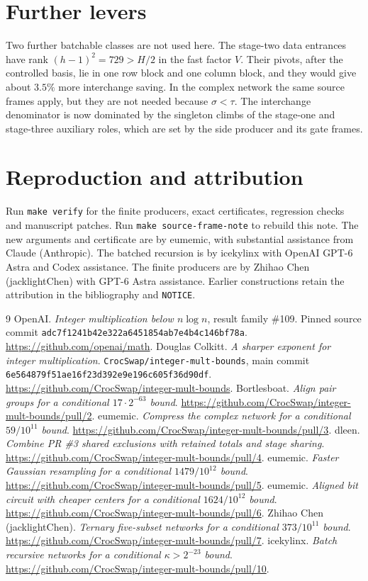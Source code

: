 \documentclass[11pt]{article}
\numberwithin{equation}{section}
\begin{document}
\section{Further levers}
Two further batchable classes are not used here. The stage-two data
entrances have rank $(h-1)^2=729>H/2$ in the fast factor $V$. Their
pivots, after the controlled basis, lie in one row block and one column
block, and they would give about $3.5\%$ more interchange saving. In the
complex network the same source frames apply, but they are not needed
because $\sigma<\tau$. The interchange denominator is now dominated by
the singleton climbs of the stage-one and stage-three auxiliary roles,
which are set by the side producer and its gate frames.

\section{Reproduction and attribution}
Run \texttt{make verify} for the finite producers, exact certificates,
regression checks and manuscript patches. Run
\texttt{make source-frame-note} to rebuild this note. The new arguments
and certificate are by eumemic, with substantial assistance from Claude
(Anthropic). The batched recursion is by icekylinx with OpenAI GPT-6 Astra
and Codex assistance. The finite producers are by Zhihao Chen
(jacklightChen) with GPT-6 Astra assistance. Earlier constructions retain
the attribution in the bibliography and \texttt{NOTICE}.

\clearpage
{\small\raggedright
\begin{thebibliography}{9}
 OpenAI.
\emph{Integer multiplication below $n\log n$}, result family \#109.
Pinned source commit \texttt{adc7f1241b42e322a6451854ab7e4b4c146bf78a}.
\url{https://github.com/openai/math}.
 Douglas Colkitt.
\emph{A sharper exponent for integer multiplication}.
\texttt{CrocSwap/integer-mult-bounds}, main commit
\texttt{6e564879f51ae16f23d392e9e196c605f36d90df}.
\url{https://github.com/CrocSwap/integer-mult-bounds}.
 Bortlesboat.
\emph{Align pair groups for a conditional $17\cdot2^{-63}$ bound}.
\url{https://github.com/CrocSwap/integer-mult-bounds/pull/2}.
 eumemic.
\emph{Compress the complex network for a conditional $59/10^{11}$ bound}.
\url{https://github.com/CrocSwap/integer-mult-bounds/pull/3}.
 dleen.
\emph{Combine PR \#3 shared exclusions with retained totals and stage sharing}.
\url{https://github.com/CrocSwap/integer-mult-bounds/pull/4}.
 eumemic.
\emph{Faster Gaussian resampling for a conditional $1479/10^{12}$ bound}.
\url{https://github.com/CrocSwap/integer-mult-bounds/pull/5}.
 eumemic.
\emph{Aligned bit circuit with cheaper centers for a conditional
$1624/10^{12}$ bound}.
\url{https://github.com/CrocSwap/integer-mult-bounds/pull/6}.
 Zhihao Chen (jacklightChen).
\emph{Ternary five-subset networks for a conditional $373/10^{11}$ bound}.
\url{https://github.com/CrocSwap/integer-mult-bounds/pull/7}.
 icekylinx.
\emph{Batch recursive networks for a conditional $\kappa>2^{-23}$ bound}.
\url{https://github.com/CrocSwap/integer-mult-bounds/pull/10}.
\end{thebibliography}
}
\end{document}
